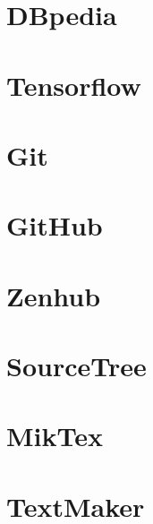 \section{DBpedia}

\section{Tensorflow}

\section{Git}

\section{GitHub}

\section{Zenhub}

\section{SourceTree}

\section{MikTex}

\section{TextMaker}

